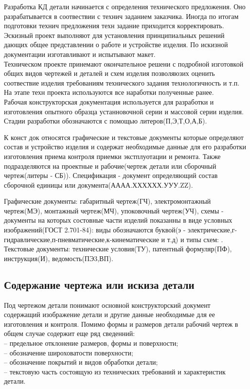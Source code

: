 \documentclass[a4paper, 12pt]{article}
\begin{document}
Разработка КД детали начинается с определения технического предложения. Оно разрабатывается в соотвествии с технич заданием заказчика. Иногда по итогам подготовки технич предложения техн задание приходится корректировать.\\

Эскизный проект выполняют для установления принципиальных решений дающих общее представлении о работе и устройстве изделия. По искизной документации изготавливают и испытывают макет. \\

Техническом проекте принемают окончательное решени с подробной изготовкой общих видов чертежей и деталей и схем изделия позволяюзих оценить соотвествие изделия требованиям технического задания технологичность и т.п. На этапе техн проекта используются все наработки полученные ранее.\\

Рабочая конструкторская документация используется для разработки и изготовления опытного образца устанновочной серии и массовой серии изделия. Стадии разработки обозначаются с помощью литеров(П,Э,Т,О,А,Б).

К конст док относятся графические и текстовые документы которые определяют состав и устройство изделия и содержат необходимые данные для его разработки изготовления приема контроля приемки экстплуотации и ремонта. Также подразделяются на проектные и рабочие(чертеж детали или сборочный чертеж(литеры - СБ)). Спецификация - документ определяющий состав сборочной единицы или документа(АААА.ХХХХХХ.УУУ.ZZ). 

Графические документы: габаритный чертеж(ГЧ), электромонтажный чертеж(МЭ), монтажный чертеж(МЧ), упоковочный чертеж(УЧ), схемы - документы на которых состовные части изделий показанны в виде условных изображений(ГОСТ 2.701-84): виды обозначаются буквой(э - электрические,г-гидравлические,п-пневматические,к-кинематические и т.д) и типы схем: %
.\\

Текстовые документы: технические условия(ТУ), патентный формуляр(ПФ), инструкция(И), ведомость(ПЭ3,ВП).


\subsection{Содержание чертежа или искиза детали}
Под чертежом детали понимают основной конструкторский документ содержащий изображение детали и другие данные необходимые для ее изготовления и контроля.
Помимо формы и размеров детали рабочий чертеж в общем случае содержит еще ряд сведенний:\\-- предельное отклонение размеров, формы и поверхности;\\ -- обозначение широховатости поверхности;\\ -- обозначение покрытий и видов обработки детали;\\ -- текстовую часть состоящую из технических требований и характеристик детали.\\
\end{document}
